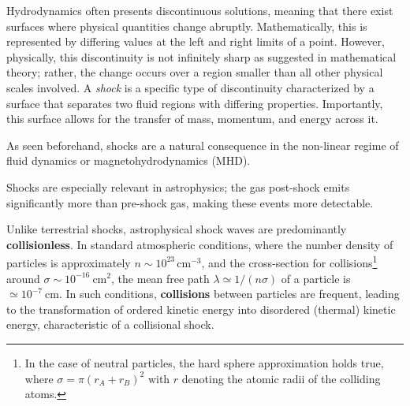 Hydrodynamics often presents discontinuous solutions, meaning that there exist surfaces where physical quantities change abruptly. Mathematically, this is represented by differing values at the left and right limits of a point. However, physically, this discontinuity is not infinitely sharp as suggested in mathematical theory; rather, the change occurs over a region smaller than all other physical scales involved. 
%
A \emph{shock} is a specific type of discontinuity characterized by a surface that separates two fluid regions with differing properties. Importantly, this surface allows for the transfer of mass, momentum, and energy across it.

As seen beforehand, shocks are a natural consequence in the non-linear regime of fluid dynamics or magnetohydrodynamics (MHD).

%

Shocks are especially relevant in astrophysics; the gas post-shock emits significantly more than pre-shock gas, making these events more detectable.

Unlike terrestrial shocks, astrophysical shock waves are predominantly \textbf{collisionless}. 
%
In standard atmospheric conditions, where the number density of particles is approximately \( n \sim 10^{23} \, \text{cm}^{-3} \), and the cross-section for collisions\footnote{In the case of neutral particles, the hard sphere approximation holds true, where \( \sigma = \pi (r_A + r_B)^2 \) with \( r \) denoting the atomic radii of the colliding atoms.} around \( \sigma \sim 10^{-16}~\text{cm}^2 \), the mean free path \( \lambda \simeq 1 / (n \sigma) \) of a particle is \( \simeq 10^{-7}~\text{cm} \). 
%
In such conditions, \textbf{collisions} between particles are frequent, leading to the transformation of ordered kinetic energy into disordered (thermal) kinetic energy, characteristic of a collisional shock.

